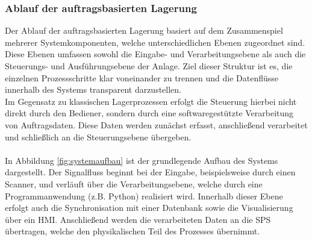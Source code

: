 \subsubsection{Ablauf der auftragsbasierten Lagerung}

Der Ablauf der auftragsbasierten Lagerung basiert auf dem Zusammenspiel mehrerer Systemkomponenten, welche unterschiedlichen Ebenen zugeordnet sind\cite{Grundlagen_Logistik}. Diese Ebenen umfassen sowohl die Eingabe- und Verarbeitungsebene als auch die Steuerungs- und Ausführungsebene der Anlage. Ziel dieser Struktur ist es, die einzelnen Prozessschritte klar voneinander zu trennen und die Datenflüsse innerhalb des Systems transparent darzustellen.\\

Im Gegensatz zu klassischen Lagerprozessen erfolgt die Steuerung hierbei nicht direkt durch den Bediener, sondern durch eine softwaregestützte Verarbeitung von Auftragsdaten. Diese Daten werden zunächst erfasst, anschließend verarbeitet und schließlich an die Steuerungsebene übergeben.\\\\
In Abbildung \ref{fig:systemaufbau} ist der grundlegende Aufbau des Systems dargestellt. Der Signalfluss beginnt bei der Eingabe, beispielsweise durch einen Scanner, und verläuft über die Verarbeitungsebene, welche durch eine Programmanwendung (z.B. Python) realisiert wird. Innerhalb dieser Ebene erfolgt auch die Synchronisation mit einer Datenbank sowie die Visualisierung über ein HMI. Anschließend werden die verarbeiteten Daten an die SPS übertragen, welche den physikalischen Teil des Prozesses übernimmt.
